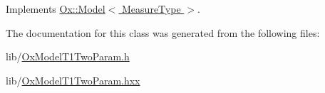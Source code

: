 Implements \hyperlink{class_ox_1_1_model_a694868476dd17a4d203f4ebc57047d2f}{Ox\+::\+Model$<$ Measure\+Type $>$}.



The documentation for this class was generated from the following files\+:\begin{DoxyCompactItemize}
\item 
lib/\hyperlink{_ox_model_t1_two_param_8h}{Ox\+Model\+T1\+Two\+Param.\+h}\item 
lib/\hyperlink{_ox_model_t1_two_param_8hxx}{Ox\+Model\+T1\+Two\+Param.\+hxx}\end{DoxyCompactItemize}
